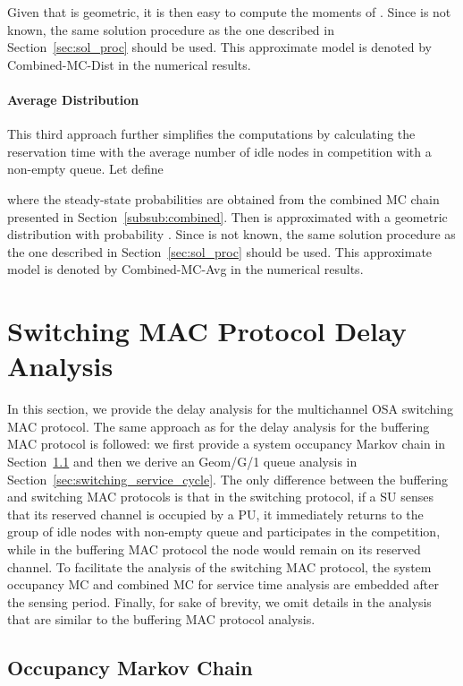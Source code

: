 \documentclass[12pt,journal,oneside,onecolumn]{IEEEtran}
\begin{document}
Given that  is geometric, it is then easy to compute the moments of .
Since  is not known, 
the same solution procedure as the one described in Section~\ref{sec:sol_proc} should be used.
This approximate model is denoted by Combined-MC-Dist in the numerical results.

\paragraph{Average  Distribution}
This third approach further simplifies the computations by calculating the reservation time with the average number of idle nodes in competition with a non-empty queue.
Let define 

where the steady-state probabilities  are obtained from the combined MC chain presented in Section~\ref{subsub:combined}.
Then  is approximated with a geometric distribution with 
probability .
Since  is not known, 
the same solution procedure as the one described in Section~\ref{sec:sol_proc} should be used.
This approximate model is denoted by Combined-MC-Avg in the numerical results.

\section{Switching MAC Protocol Delay Analysis}
\label{sec:switching}

In this section, we provide the delay analysis for the multichannel OSA switching MAC protocol. 
The same approach as for the delay analysis for the buffering MAC protocol is followed: we first 
provide a system occupancy Markov chain in Section~\ref{sec:switching_occ_mc} and then we derive an Geom/G/1 queue analysis 
in Section~\ref{sec:switching_service_cycle}. 
The only difference between the buffering and switching MAC protocols is that in the switching protocol, if a SU senses that its reserved channel is occupied
by a PU, it immediately returns to the group of idle nodes with non-empty queue and participates in the competition, while in the buffering MAC protocol
the node would remain on its reserved channel. To facilitate the analysis of the switching MAC protocol, the system occupancy MC and combined MC for service time analysis
are embedded after the sensing period. Finally, for
sake of brevity, we omit details in the analysis that are similar to the buffering MAC protocol analysis.





\subsection{Occupancy Markov Chain}
\label{sec:switching_occ_mc}
\end{document}
